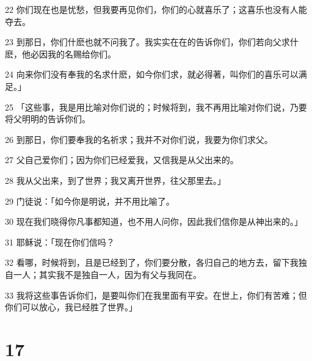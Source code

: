 \par 22 你们现在也是忧愁，但我要再见你们，你们的心就喜乐了；这喜乐也没有人能夺去。
\par 23 到那日，你们什麽也就不问我了。我实实在在的告诉你们，你们若向父求什麽，他必因我的名赐给你们。
\par 24 向来你们没有奉我的名求什麽，如今你们求，就必得著，叫你们的喜乐可以满足。」
\par 25 「这些事，我是用比喻对你们说的；时候将到，我不再用比喻对你们说，乃要将父明明的告诉你们。
\par 26 到那日，你们要奉我的名祈求；我并不对你们说，我要为你们求父。
\par 27 父自己爱你们；因为你们已经爱我，又信我是从父出来的。
\par 28 我从父出来，到了世界；我又离开世界，往父那里去。」
\par 29 门徒说：「如今你是明说，并不用比喻了。
\par 30 现在我们晓得你凡事都知道，也不用人问你，因此我们信你是从神出来的。」
\par 31 耶稣说：「现在你们信吗？
\par 32 看哪，时候将到，且是已经到了，你们要分散，各归自己的地方去，留下我独自一人；其实我不是独自一人，因为有父与我同在。
\par 33 我将这些事告诉你们，是要叫你们在我里面有平安。在世上，你们有苦难；但你们可以放心，我已经胜了世界。」

\chapter{17}

